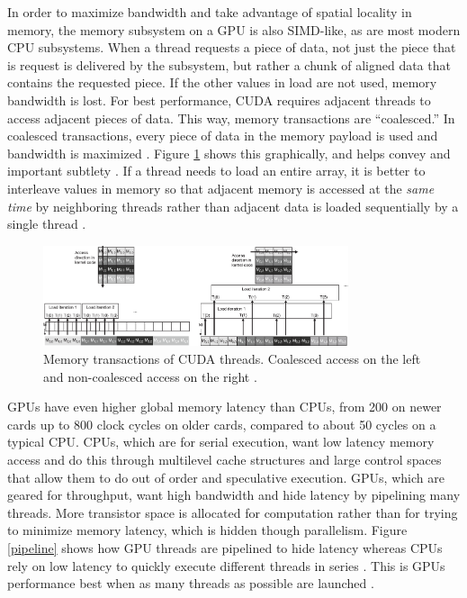 In order to maximize bandwidth and take advantage of spatial locality in memory, the memory subsystem on a GPU is also SIMD-like, as are most modern CPU subsystems.  When a thread requests a piece of data, not just the piece that is request is delivered by the subsystem, but rather a chunk of aligned data that contains the requested piece.  If the other values in load are not used, memory bandwidth is lost.  For best performance, CUDA requires adjacent threads to access adjacent pieces of data.  This way, memory transactions are ``coalesced.''   In coalesced transactions, every piece of data in the memory payload is used and bandwidth is maximized \cite{cuda}.  Figure \ref{coalesced} shows this graphically, and helps convey and important subtlety \cite{programming_massively}.  If a thread needs to load an entire array, it is better to interleave values in memory so that adjacent memory is accessed at the \emph{same time} by neighboring threads rather than adjacent data is loaded sequentially by a single thread \cite{cuda}.

\begin{figure}[h!] 
  \centering
    \includegraphics[width=0.8\textwidth]{graphics/coalesced.eps}
     \caption{Memory transactions of CUDA threads.  Coalesced access on the left and non-coalesced access on the right \cite{programming_massively}. \label{coalesced}}
\end{figure}

GPUs have even higher global memory latency than CPUs, from 200 on newer cards up to 800 clock cycles on older cards, compared to about 50 cycles on a typical CPU.  CPUs, which are for serial execution, want low latency memory access and do this through multilevel cache structures and large control spaces that allow them to do out of order and speculative execution.  GPUs, which are geared for throughput, want high bandwidth and hide latency by pipelining many threads.  More transistor space is allocated for computation rather than for trying to minimize memory latency, which is hidden though parallelism.  Figure \ref{pipeline} shows how GPU threads are pipelined to hide latency whereas CPUs rely on low latency to quickly execute different threads in series \cite{cuda_gtc_pres}.  This is GPUs performance best when as many threads as possible are launched \cite{cuda}.

